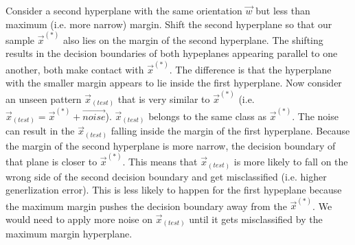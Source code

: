 \begin{frame}
{            Consider a second hyperplane with the same orientation $\vec w$ but less than maximum (i.e. more narrow) margin. Shift the second hyperplane so that our sample $\vec x^{(*)}$ also lies on the margin of the second hyperplane. The shifting results in the decision boundaries of both hypeplanes appearing parallel to one another, both make contact with $\vec x^{(*)}$. The difference is that the hyperplane with the smaller margin appears to lie inside the first hyperplane. Now consider an unseen pattern $\vec x_{(test)}$ that is very similar to $\vec x^{(*)}$ (i.e. $\vec x_{(test)} = \vec x^{(*)} + \vec {noise}$). $\vec x_{(test)}$ belongs to the same class as $\vec x^{(*)}$. The noise can result in the $\vec x_{(test)}$ falling inside the margin of the first hyperplane. Because the margin of the second hyperplane is more narrow, the decision boundary of that plane is closer to $\vec x^{(*)}$. This means that $\vec x_{(test)}$ is more likely to fall on the wrong side of the second decision boundary and get misclassified (i.e. higher generlization error). This is less likely to happen for the first hypeplane because the maximum margin pushes the decision boundary away from the $\vec x^{(*)}$. We would need to apply more noise on $\vec x_{(test)}$  until it gets misclassified by the maximum margin hyperplane.\vspace{5cm}
            
}
    
\end{frame}

